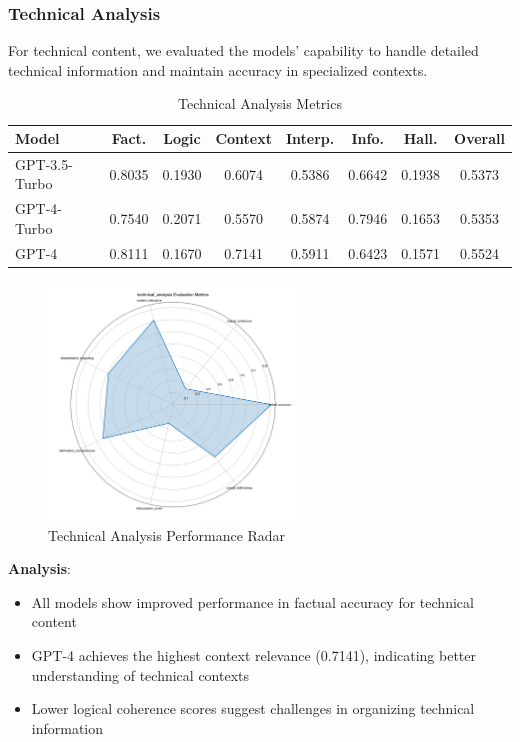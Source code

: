 \subsubsection{Technical Analysis}
For technical content, we evaluated the models' capability to handle detailed technical information and maintain accuracy in specialized contexts.

\begin{table}[!htbp]
\centering
\setlength{\tabcolsep}{4pt}  %
\caption{Technical Analysis Metrics}
\label{tab:results_technical_metrics}
\begin{tabular}{|l|c|c|c|c|c|c|c|}
\hline
\textbf{Model} & \textbf{Fact.} & \textbf{Logic} & \textbf{Context} & \textbf{Interp.} 
& \textbf{Info.} & \textbf{Hall.} & \textbf{Overall} \\
\hline
GPT-3.5-Turbo & 0.8035 & 0.1930 & 0.6074 & 0.5386 & 0.6642 & 0.1938 & 0.5373 \\
GPT-4-Turbo & 0.7540 & 0.2071 & 0.5570 & 0.5874 & 0.7946 & 0.1653 & 0.5353 \\
GPT-4 & 0.8111 & 0.1670 & 0.7141 & 0.5911 & 0.6423 & 0.1571 & 0.5524 \\
\hline
\end{tabular}
\end{table}

\begin{figure}[!htbp]
\centering
\includegraphics[width=0.6\textwidth]{figures/types/technical_analysis_radar_gpt-4.png}
\caption{Technical Analysis Performance Radar}
\label{fig:technical_radar}
\end{figure}

\textbf{Analysis}:
\begin{itemize}
    \item All models show improved performance in factual accuracy for technical content
    \item GPT-4 achieves the highest context relevance (0.7141), indicating better understanding of technical contexts
    \item Lower logical coherence scores suggest challenges in organizing technical information
\end{itemize}

